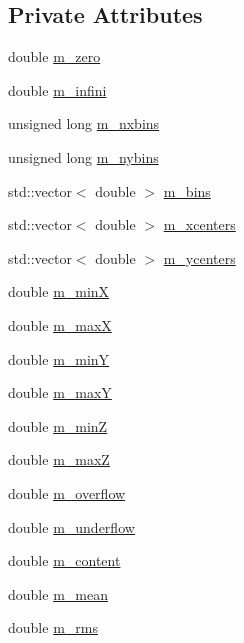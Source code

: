 \subsection*{Private Attributes}
\begin{DoxyCompactItemize}
\item 
double \hyperlink{classHisto2D_a71dfc840fbaa159ef22091312d1ae5d9}{m\_\-zero}
\item 
double \hyperlink{classHisto2D_a3763bdf81d08ba44aa56c0e85de95ff3}{m\_\-infini}
\item 
unsigned long \hyperlink{classHisto2D_a39a9d29010bf81c546a1ad1b01f7cb43}{m\_\-nxbins}
\item 
unsigned long \hyperlink{classHisto2D_afebeb164369fa9cea59f226d71907e3d}{m\_\-nybins}
\item 
std::vector$<$ double $>$ \hyperlink{classHisto2D_a84f6c03673499f34b981cdebf69d22aa}{m\_\-bins}
\item 
std::vector$<$ double $>$ \hyperlink{classHisto2D_aa2e8211f89d086e1c0beaf3b7d18c568}{m\_\-xcenters}
\item 
std::vector$<$ double $>$ \hyperlink{classHisto2D_a2a431c0f22a038482fc8b3913743f08b}{m\_\-ycenters}
\item 
double \hyperlink{classHisto2D_a039d7f45ec8b5b84c1d71f8f87884211}{m\_\-minX}
\item 
double \hyperlink{classHisto2D_af428efc9b984006eeba1a216f7d15d6d}{m\_\-maxX}
\item 
double \hyperlink{classHisto2D_a5bea9523f4ac077b0cc72cc1b28e0834}{m\_\-minY}
\item 
double \hyperlink{classHisto2D_a049044e82d008636040c5c8815cac297}{m\_\-maxY}
\item 
double \hyperlink{classHisto2D_a6cfa2290ee0d786b37f7ed08129c60e3}{m\_\-minZ}
\item 
double \hyperlink{classHisto2D_a82422535a6aeaf911129c91e0e44e603}{m\_\-maxZ}
\item 
double \hyperlink{classHisto2D_a7ab17bc811ce4a5b45ab3779cc8e221a}{m\_\-overflow}
\item 
double \hyperlink{classHisto2D_ab21996b2788e5d0e78bb611df3584440}{m\_\-underflow}
\item 
double \hyperlink{classHisto2D_ab70be93148e5c9b24e48b60c6b3b5f89}{m\_\-content}
\item 
double \hyperlink{classHisto2D_a78286e1d11cc657a5fd1bd1f60c8dff9}{m\_\-mean}
\item 
double \hyperlink{classHisto2D_a461938b95bb93a810ae7941a181023cc}{m\_\-rms}
\end{DoxyCompactItemize}


